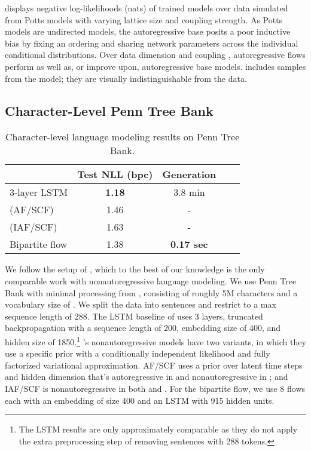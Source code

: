 \documentclass{article}
\begin{document}
 displays negative log-likelihoods (nats) of trained models over data simulated from Potts models with varying lattice size and coupling strength. As Potts models are undirected models, the autoregressive base posits a poor inductive bias by fixing an ordering and sharing network parameters across the individual conditional distributions. Over data dimension  and coupling , autoregressive flows perform as well as, or improve upon, autoregressive base models.  includes samples from the model; they are visually indistinguishable from the data.

\subsection{Character-Level Penn Tree Bank}

\begin{table*}[!t]
\centering
\begin{tabular}{lcccc}
\\  \toprule
& Test NLL (bpc) & Generation \\ \midrule
3-layer LSTM \citep{merity2018analysis}  & \textbf{1.18} &  3.8 min \\
\citet{ziegler2019latent} (AF/SCF) &  1.46 & - \\
\citet{ziegler2019latent} (IAF/SCF) &  1.63 & - \\
Bipartite flow & 1.38 & \textbf{0.17 sec} \\
\bottomrule
\end{tabular}
\caption{Character-level language modeling results on Penn Tree Bank. }
\label{table:ptb}
\end{table*}

We follow the setup of \citet{ziegler2019latent}, which to the best of our knowledge is the only comparable work with nonautoregressive language modeling. We use Penn Tree Bank with minimal processing from \citet{mikolov2012subword}, consisting of roughly 5M characters and a vocabulary size of .
We split the data into sentences and restrict to a max sequence length of 288.
The LSTM baseline of \citet{merity2018analysis} uses 3 layers, truncated backpropagation with a sequence length of 200, embedding size of 400, and hidden size of 1850.\footnote{The LSTM results are only approximately comparable as they do not apply the extra preprocessing step of removing sentences with 288 tokens.} \citet{ziegler2019latent}'s nonautoregressive models  have two variants, in which they use a specific prior with a conditionally independent likelihood and fully factorized variational approximation. AF/SCF uses a prior  over latent time steps and hidden dimension that's autoregressive in  and nonautoregressive in ; and IAF/SCF is nonautoregressive in both  and . For the bipartite flow, we use 8 flows each with an embedding of size 400 and an LSTM with 915 hidden units.
\end{document}
